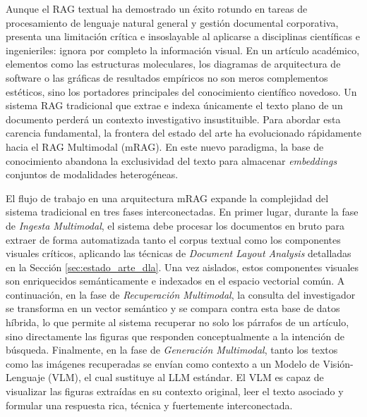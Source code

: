 \documentclass[a4paper]{report}
\begin{document}
Aunque el RAG textual ha demostrado un éxito rotundo en tareas de procesamiento de lenguaje natural general y gestión documental corporativa, presenta una limitación crítica e insoslayable al aplicarse a disciplinas científicas e ingenieriles: ignora por completo la información visual. En un artículo académico, elementos como las estructuras moleculares, los diagramas de arquitectura de software o las gráficas de resultados empíricos no son meros complementos estéticos, sino los portadores principales del conocimiento científico novedoso. Un sistema RAG tradicional que extrae e indexa únicamente el texto plano de un documento perderá un contexto investigativo insustituible. Para abordar esta carencia fundamental, la frontera del estado del arte ha evolucionado rápidamente hacia el RAG Multimodal (mRAG). En este nuevo paradigma, la base de conocimiento abandona la exclusividad del texto para almacenar \textit{embeddings} conjuntos de modalidades heterogéneas. 

El flujo de trabajo en una arquitectura mRAG expande la complejidad del sistema tradicional en tres fases interconectadas. En primer lugar, durante la fase de \textit{Ingesta Multimodal}, el sistema debe procesar los documentos en bruto para extraer de forma automatizada tanto el corpus textual como los componentes visuales críticos, aplicando las técnicas de \textit{Document Layout Analysis} detalladas en la Sección \ref{sec:estado_arte_dla}. Una vez aislados, estos componentes visuales son enriquecidos semánticamente e indexados en el espacio vectorial común. A continuación, en la fase de \textit{Recuperación Multimodal}, la consulta del investigador se transforma en un vector semántico y se compara contra esta base de datos híbrida, lo que permite al sistema recuperar no solo los párrafos de un artículo, sino directamente las figuras que responden conceptualmente a la intención de búsqueda. Finalmente, en la fase de \textit{Generación Multimodal}, tanto los textos como las imágenes recuperadas se envían como contexto a un Modelo de Visión-Lenguaje (VLM), el cual sustituye al LLM estándar. El VLM es capaz de visualizar las figuras extraídas en su contexto original, leer el texto asociado y formular una respuesta rica, técnica y fuertemente interconectada.
\end{document}
